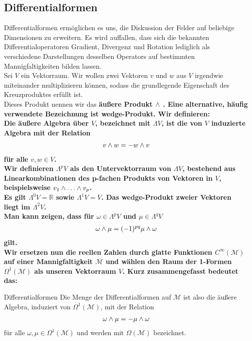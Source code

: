 \subsection{Differentialformen}
Differentialformen ermöglichen es uns, die Diskussion der Felder auf beliebige Dimensionen zu erweitern. Es wird auffallen, dass sich die bekannten Differentialoperatoren Gradient, Divergenz und Rotation lediglich als verschiedene Darstellungen desselben Operators auf bestimmten Mannigfaltigkeiten bilden lassen. \\
Sei $V$ ein Vektorraum. Wir wollen zwei Vektoren $v$ und $w$ aus $V$ irgendwie miteinander multiplizieren können, sodass die grundlegende Eigenschaft des Kreuzproduktes erfüllt ist. \\
Dieses Produkt nennen wir das \bfseries äußere Produkt $\wedge$ \normalfont. Eine alternative, häufig verwendete Bezeichnung ist \bfseries wedge-Produkt. \normalfont
Wir definieren: \\
Die äußere Algebra über $V$, bezeichnet mit $\Lambda V$, ist die von $V$ induzierte Algebra mit der Relation
\begin{align}
v \wedge w = -w \wedge v
\end{align}
für alle $v,w \in V$. \\
Wir definieren $\Lambda^p V$ als den Untervektorraum von $\Lambda V$, bestehend aus Linearkombinationen des p-fachen Produkts von Vektoren in $V$, beispielsweise $v_1 \w \dots \w v_p$. \\
Es gilt $\Lambda^0 V = \mathbb{R}$ sowie $\Lambda^1 V = V$. Das wedge-Produkt zweier Vektoren liegt im $\Lambda^2 V$. \\
Man kann zeigen, dass für $\omega \in \Lambda^p V$ und $\mu \in \Lambda^q V$
\begin{align*}
\omega \wedge \mu = (-1)^{pq} \mu \wedge \omega
\end{align*}
gilt. \\
Wir ersetzen nun die reellen Zahlen durch glatte Funktionen $C^{\infty}(\mathcal{M})$ auf einer Mannigfaltigkeit $\mathcal{M}$ und wählen den Raum der 1-Formen $\Omega^1(\mathcal{M})$ als unseren Vektorraum $V$. Kurz zusammengefasst bedeutet das:
\begin{mybox}{Differentialformen}
Die Menge der Differentialformen auf $\mathcal{M}$ ist also die äußere Algebra, induziert von $\Omega^1(\mathcal{M})$, mit der Relation 
\begin{align*}
\omega \wedge \mu = -\mu \wedge \omega 
\end{align*} 
für alle $\omega, \mu \in \Omega^1(\mathcal{M})$ und werden mit $\Omega(\mathcal{M})$ bezeichnet.
\end{mybox}
